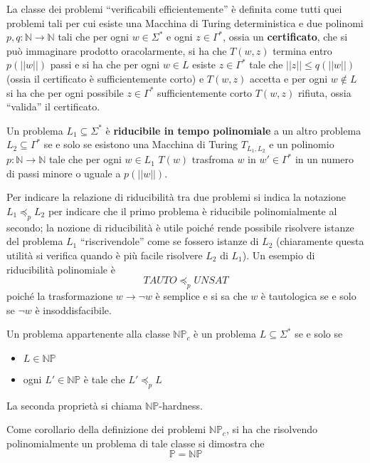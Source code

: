 \begin{defi}
  La classe dei problemi ``verificabili efficientemente'' è definita come 
  tutti quei problemi tali per cui esiste una Macchina di Turing deterministica 
  e due polinomi $p,q:\mathbb{N}\rightarrow \mathbb{N}$ tali che per ogni 
  $w \in \Sigma^*$ e ogni $z \in \Gamma^*$, ossia un \textbf{certificato}, 
  che si può immaginare prodotto oracolarmente, si ha 
  che $T(w,z)$ termina entro $p(||w||)$ passi e si ha che per ogni 
  $w \in L$ esiste $z \in \Gamma^*$ tale che $||z|| \leq q(||w||)$ (ossia 
  il certificato è sufficientemente corto) e $T(w,z)$ accetta e per ogni 
  $w \notin L$ si ha che per ogni possibile $z \in \Gamma^*$ sufficientemente corto
  $T(w,z)$ rifiuta, ossia ``valida'' il certificato.
\end{defi}

\begin{defi}[Riducibilità]
        Un problema $L_1 \subseteq \Sigma^*$ è \textbf{riducibile in tempo polinomiale} 
        a un altro problema $L_2 \subseteq \Gamma^*$ se e solo se esistono
        una Macchina di Turing $T_{{L_1}, {L_2}}$ e un polinomio
        $p: \mathbb{N} \rightarrow \mathbb{N}$ tale che per ogni $w \in L_1$
        $T(w)$ trasfroma $w$ in $w' \in \Gamma^*$ in un numero di passi 
        minore o uguale a $p(||w||)$. 
\end{defi}

Per indicare la relazione di riducibilità tra due problemi si indica la notazione 
$L_1 \preceq_p L_2$ per indicare che il primo problema è riducibile polinomialmente 
al secondo; la nozione di riducibilità è utile poiché rende possibile risolvere 
istanze del problema $L_1$ ``riscrivendole'' come se fossero istanze di $L_2$
(chiaramente questa utilità si verifica quando è più facile risolvere $L_2$ di 
$L_1$). 
Un esempio di riducibilità polinomiale è 
$$
TAUTO \preceq_p UNSAT
$$
poiché la trasformazione $w \rightarrow \neg w$ è semplice e si sa che 
$w$ è tautologica se e solo se $\neg w$ è insoddisfacibile.

\begin{defi}
        Un problema appartenente alla classe $\mathbb{NP}_c$ è un problema 
        $L \subseteq \Sigma^*$ se e solo se 
        \begin{itemize}
                \item $L \in \mathbb{NP}$
                \item ogni $L' \in \mathbb{NP}$ è tale che $L' \preceq_p L$ 
        \end{itemize}
        La seconda proprietà si chiama $\mathbb{NP}$-hardness. 
\end{defi}
Come corollario della definizione dei problemi $\mathbb{NP}_c$, si ha che risolvendo 
polinomialmente un problema di tale classe si dimostra che 
$$
\mathbb{P} = \mathbb{NP}
$$

